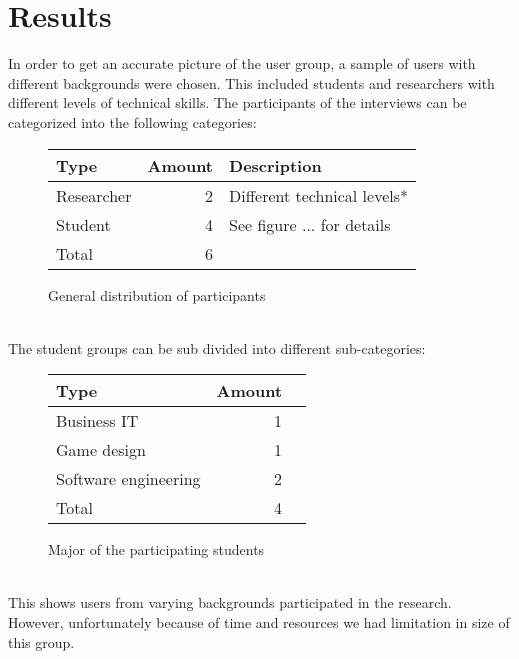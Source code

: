 \documentclass[conference]{IEEEtran}
\begin{document}
\section{Results}
	In order to get an accurate picture of the user group, a sample of users with different backgrounds were chosen. This included students and researchers with different levels of technical skills. The participants of the interviews can be categorized into the following categories:
	\begin{figure}[ht]
		\centering
		\begin{tabular}{ | l | r | l | }
			\hline
			Type			& Amount	& Description \\ \hline \hline
			Researcher		& 2			& Different technical levels* \\ \hline
			Student			& 4			& See figure ... for details \\ \hline \hline
			Total			& 6			& \\ \hline
		\end{tabular}
		\caption{General distribution of participants}
	\end{figure}\\
	The student groups can be sub divided into different sub-categories:
	\begin{figure}[ht]
		\centering
		\begin{tabular}{ | l | r | l | }
			\hline
			Type					& Amount \\ \hline \hline
			Business IT				& 1 \\ \hline
			Game design				& 1 \\ \hline
			Software engineering	& 2 \\ \hline
			Total					& 4 \\ \hline
		\end{tabular}
		\caption{Major of the participating students}
	\end{figure} \\
		This shows users from varying backgrounds participated in the research. However, unfortunately because of time and resources we had limitation in size of this group.
\end{document}
